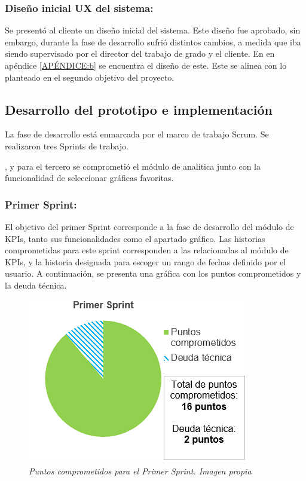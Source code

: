 \documentclass[spanish]{ieee_upb}
\begin{document}
\subsubsection{Diseño inicial UX del sistema: }
Se presentó al cliente un diseño inicial del sistema. Este diseño fue aprobado, sin embargo, durante la fase de desarrollo sufrió distintos cambios, a medida que iba siendo supervisado por el director del trabajo de grado y el cliente. En en apéndice \ref{APÉNDICE:b} se encuentra el diseño de este. Este se alinea con lo planteado en el segundo objetivo del proyecto. 

\subsection{Desarrollo del prototipo e implementación}

La fase de desarrollo está enmarcada por el marco de trabajo Scrum. Se realizaron tres Sprints de trabajo.

, y para el tercero se comprometió el módulo de analítica junto con la funcionalidad de seleccionar gráficas favoritas.
 
 \subsubsection{Primer Sprint: }
 El objetivo del primer Sprint corresponde a la fase de desarrollo del módulo de KPIs, tanto sus funcionalidades como el apartado gráfico. Las historias comprometidas
 para este sprint corresponden a las relacionadas al módulo de KPIs, y la historia designada para escoger un rango de fechas definido por el usuario.
 A continuación, se presenta una gráfica con los puntos comprometidos y la deuda técnica. 

\begin{figure}[htpb] 
	\centering
	\includegraphics[width=0.4\linewidth]{img/Sprints/S1.png}
	\vspace{-1mm}
	\caption[Puntos comprometidos primer Sprint]{\textit{Puntos comprometidos para el Primer Sprint. Imagen propia}}
	\label{fig:S1} 
\end{figure}
\end{document}
